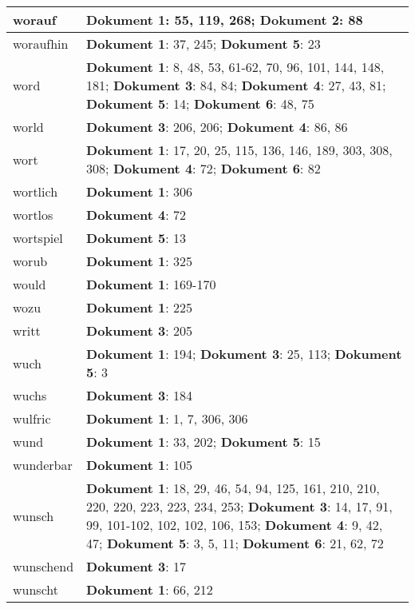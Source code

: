 \documentclass[a5paper]{article}
\begin{document}
\begin{longtable}[l]{|l|p{3in}|}
\hline
worauf & \textbf{Dokument 1}: 55, 119, 268; \textbf{Dokument 2}: 88 \\
\hline
woraufhin & \textbf{Dokument 1}: 37, 245; \textbf{Dokument 5}: 23 \\
\hline
word & \textbf{Dokument 1}: 8, 48, 53, 61-62, 70, 96, 101, 144, 148, 181; \textbf{Dokument 3}: 84, 84; \textbf{Dokument 4}: 27, 43, 81; \textbf{Dokument 5}: 14; \textbf{Dokument 6}: 48, 75 \\
\hline
world & \textbf{Dokument 3}: 206, 206; \textbf{Dokument 4}: 86, 86 \\
\hline
wort & \textbf{Dokument 1}: 17, 20, 25, 115, 136, 146, 189, 303, 308, 308; \textbf{Dokument 4}: 72; \textbf{Dokument 6}: 82 \\
\hline
wortlich & \textbf{Dokument 1}: 306 \\
\hline
wortlos & \textbf{Dokument 4}: 72 \\
\hline
wortspiel & \textbf{Dokument 5}: 13 \\
\hline
worub & \textbf{Dokument 1}: 325 \\
\hline
would & \textbf{Dokument 1}: 169-170 \\
\hline
wozu & \textbf{Dokument 1}: 225 \\
\hline
writt & \textbf{Dokument 3}: 205 \\
\hline
wuch & \textbf{Dokument 1}: 194; \textbf{Dokument 3}: 25, 113; \textbf{Dokument 5}: 3 \\
\hline
wuchs & \textbf{Dokument 3}: 184 \\
\hline
wulfric & \textbf{Dokument 1}: 1, 7, 306, 306 \\
\hline
wund & \textbf{Dokument 1}: 33, 202; \textbf{Dokument 5}: 15 \\
\hline
wunderbar & \textbf{Dokument 1}: 105 \\
\hline
wunsch & \textbf{Dokument 1}: 18, 29, 46, 54, 94, 125, 161, 210, 210, 220, 220, 223, 223, 234, 253; \textbf{Dokument 3}: 14, 17, 91, 99, 101-102, 102, 102, 106, 153; \textbf{Dokument 4}: 9, 42, 47; \textbf{Dokument 5}: 3, 5, 11; \textbf{Dokument 6}: 21, 62, 72 \\
\hline
wunschend & \textbf{Dokument 3}: 17 \\
\hline
wunscht & \textbf{Dokument 1}: 66, 212 \\
\hline

\end{longtable}
\end{document}
